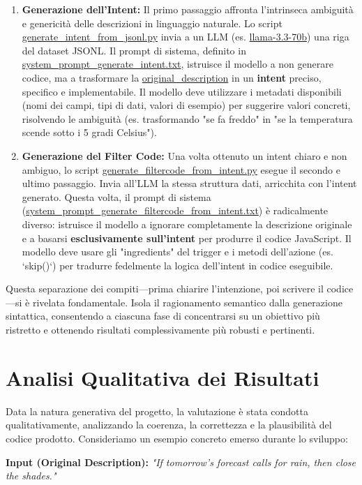 \documentclass[sigconf,natbib=false]{acmart}
\begin{document}
\begin{enumerate}
    \item \textbf{Generazione dell'Intent:} Il primo passaggio affronta l'intrinseca ambiguità e genericità delle descrizioni in linguaggio naturale. Lo script \url{generate_intent_from_jsonl.py} invia a un LLM (es. \url{llama-3.3-70b}) una riga del dataset JSONL. Il prompt di sistema, definito in \url{system_prompt_generate_intent.txt}, istruisce il modello a non generare codice, ma a trasformare la \url{original_description} in un \textbf{intent} preciso, specifico e implementabile. Il modello deve utilizzare i metadati disponibili (nomi dei campi, tipi di dati, valori di esempio) per suggerire valori concreti, risolvendo le ambiguità (es. trasformando "se fa freddo" in "se la temperatura scende sotto i 5 gradi Celsius").
    
    \item \textbf{Generazione del Filter Code:} Una volta ottenuto un intent chiaro e non ambiguo, lo script \url{generate_filtercode_from_intent.py} esegue il secondo e ultimo passaggio. Invia all'LLM la stessa struttura dati, arricchita con l'intent generato. Questa volta, il prompt di sistema (\url{system_prompt_generate_filtercode_from_intent.txt}) è radicalmente diverso: istruisce il modello a ignorare completamente la descrizione originale e a basarsi \textbf{esclusivamente sull'intent} per produrre il codice JavaScript. Il modello deve usare gli "ingredients" del trigger e i metodi dell'azione (es. `skip()`) per tradurre fedelmente la logica dell'intent in codice eseguibile.
\end{enumerate}

Questa separazione dei compiti—prima chiarire l'intenzione, poi scrivere il codice—si è rivelata fondamentale. Isola il ragionamento semantico dalla generazione sintattica, consentendo a ciascuna fase di concentrarsi su un obiettivo più ristretto e ottenendo risultati complessivamente più robusti e pertinenti.

\section{Analisi Qualitativa dei Risultati}
Data la natura generativa del progetto, la valutazione è stata condotta qualitativamente, analizzando la coerenza, la correttezza e la plausibilità del codice prodotto. Consideriamo un esempio concreto emerso durante lo sviluppo:

\noindent\textbf{Input (Original Description):} \textit{"If tomorrow's forecast calls for rain, then close the shades."}
\end{document}
